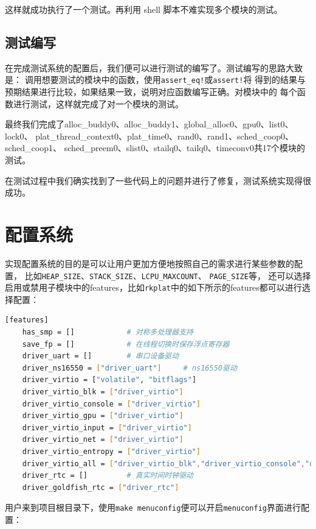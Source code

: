 \documentclass{../runikraft-report}
\begin{document}
这样就成功执行了一个测试。再利用 shell 脚本不难实现多个模块的测试。

\subsection{测试编写}

在完成测试系统的配置后，我们便可以进行测试的编写了。测试编写的思路大致是：
调用想要测试的模块中的函数，使用\texttt{assert\_eq!}或\texttt{assert!}将
得到的结果与预期结果进行比较，如果结果一致，说明对应函数编写正确。对模块中的
每个函数进行测试，这样就完成了对一个模块的测试。

最终我们完成了alloc\_buddy0、alloc\_buddy1、global\_alloc0、gpu0、list0、lock0、
plat\_\linebreak thread\_context0、plat\_time0、rand0、rand1、sched\_coop0、sched\_coop1、
sched\_preem0、slist0、stailq0、tailq0、timeconv0共17个模块的测试。

在测试过程中我们确实找到了一些代码上的问题并进行了修复，测试系统实现得很成功。

\section{配置系统}
实现配置系统的目的是可以让用户更加方便地按照自己的需求进行某些参数的配置，
比如\texttt{HEAP\_SIZE}、\texttt{STACK\_SIZE}、\texttt{LCPU\_MAXCOUNT}、
\texttt{PAGE\_SIZE}等，
还可以选择启用或禁用子模块中的features，比如\texttt{rkplat}中的如下所示的features都可以进行选择配置：

\begin{lstlisting}[language=sh]
[features]
    has_smp = []            # 对称多处理器支持
    save_fp = []            # 在线程切换时保存浮点寄存器
    driver_uart = []        # 串口设备驱动
    driver_ns16550 = ["driver_uart"]     # ns16550驱动
    driver_virtio = ["volatile", "bitflags"]
    driver_virtio_blk = ["driver_virtio"]
    driver_virtio_console = ["driver_virtio"]
    driver_virtio_gpu = ["driver_virtio"]
    driver_virtio_input = ["driver_virtio"]
    driver_virtio_net = ["driver_virtio"]
    driver_virtio_entropy = ["driver_virtio"]
    driver_virtio_all = ["driver_virtio_blk","driver_virtio_console","driver_virtio_gpu","driver_virtio_input","driver_virtio_net","driver_virtio_entropy"]
    driver_rtc = []         # 真实时间时钟驱动
    driver_goldfish_rtc = ["driver_rtc"]
\end{lstlisting}

用户来到项目根目录下，使用\texttt{make menuconfig}便可以开启\texttt{menuconfig}界面进行配置：
\end{document}
